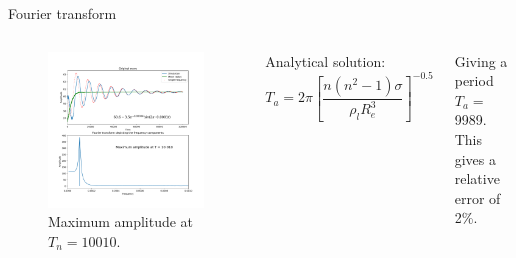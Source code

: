 \documentclass{beamer}
\begin{document}
	\begin{frame}{Fourier transform}
		
		\begin{columns}
			
			\begin{figure}[h]
				\centering
				\includegraphics[width=1\linewidth]{pics/fourier.pdf}
				\caption{Maximum amplitude at $T_n = 10010$.}
				\label{fig:2cOsc}
			\end{figure}
			
			Analytical solution:
			\begin{equation}
			T_a = 2 \pi \left[ \frac{n (n^2-1) \sigma}{\rho_l R_e^3} \right]^{-0.5}
			\end{equation}
			
			Giving a period $T_a = $ 9989. This gives a relative error of 2\%. 
			
		\end{columns}
		
		
	\end{frame}
	
\end{document}
